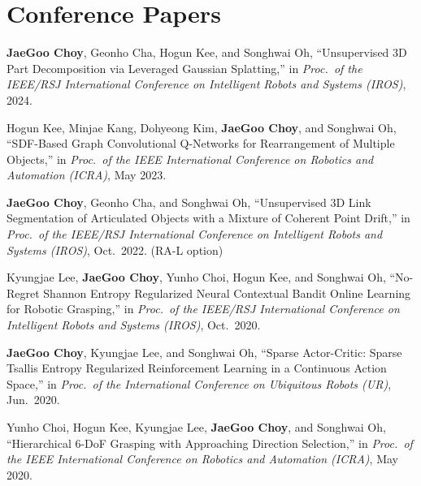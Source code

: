 \documentclass[10pt]{article}
\begin{document}
\section{Conference Papers}
\begin{enumerate}[label={[C\arabic*]}, leftmargin=2.5em, itemsep=4pt]
  \setcounter{enumi}{5}

  \item \textbf{JaeGoo Choy}, Geonho Cha, Hogun Kee, and Songhwai Oh,
  ``Unsupervised 3D Part Decomposition via Leveraged Gaussian Splatting,''
  in \textit{Proc.\ of the IEEE/RSJ International Conference on Intelligent Robots and Systems (IROS)}, 2024.

  \setcounter{enumi}{4}
  \item Hogun Kee, Minjae Kang, Dohyeong Kim, \textbf{JaeGoo Choy}, and Songhwai Oh,
  ``SDF-Based Graph Convolutional Q-Networks for Rearrangement of Multiple Objects,''
  in \textit{Proc.\ of the IEEE International Conference on Robotics and Automation (ICRA)}, May 2023.

  \setcounter{enumi}{3}
  \item \textbf{JaeGoo Choy}, Geonho Cha, and Songhwai Oh,
  ``Unsupervised 3D Link Segmentation of Articulated Objects with a Mixture of Coherent Point Drift,''
  in \textit{Proc.\ of the IEEE/RSJ International Conference on Intelligent Robots and Systems (IROS)}, Oct.\ 2022. (RA-L option)

  \setcounter{enumi}{2}
  \item Kyungjae Lee, \textbf{JaeGoo Choy}, Yunho Choi, Hogun Kee, and Songhwai Oh,
  ``No-Regret Shannon Entropy Regularized Neural Contextual Bandit Online Learning for Robotic Grasping,''
  in \textit{Proc.\ of the IEEE/RSJ International Conference on Intelligent Robots and Systems (IROS)}, Oct.\ 2020.

  \newpage
  \setcounter{enumi}{1}
  \item \textbf{JaeGoo Choy}, Kyungjae Lee, and Songhwai Oh,
  ``Sparse Actor-Critic: Sparse Tsallis Entropy Regularized Reinforcement Learning in a Continuous Action Space,''
  in \textit{Proc.\ of the International Conference on Ubiquitous Robots (UR)}, Jun.\ 2020.

  \setcounter{enumi}{0}
  \item Yunho Choi, Hogun Kee, Kyungjae Lee, \textbf{JaeGoo Choy}, and Songhwai Oh,
  ``Hierarchical 6-DoF Grasping with Approaching Direction Selection,''
  in \textit{Proc.\ of the IEEE International Conference on Robotics and Automation (ICRA)}, May 2020.

\end{enumerate}
\end{document}
